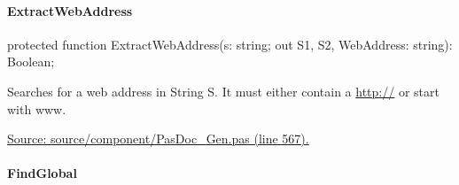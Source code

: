 \documentclass{report}
\newif\ifpdf
\begin{document}
\paragraph*{ExtractWebAddress}\hspace*{\fill}

\label{PasDoc_Gen.TDocGenerator-ExtractWebAddress}
\begin{list}{}{
\setlength{\itemindent}{0cm}
\setlength{\listparindent}{0cm}
\setlength{\leftmargin}{\evensidemargin}
\addtolength{\leftmargin}{\tmplength}
\settowidth{\labelsep}{X}
\addtolength{\leftmargin}{\labelsep}
\setlength{\labelwidth}{\tmplength}
}
\item[\textbf{Declaration}\hfill]
\ifpdf
\begin{flushleft}
\fi
\begin{ttfamily}
protected function ExtractWebAddress(s: string; out S1, S2, WebAddress: string): Boolean;\end{ttfamily}

\ifpdf
\end{flushleft}
\fi

\par
\item[\textbf{Description}]
Searches for a web address in String S. It must either contain a \href{http://}{http://} or start with www.\par
\href{https://github.com/pasdoc/pasdoc/blob/master/source/component/PasDoc_Gen.pas#L567}{Source: source/component/PasDoc{\_}Gen.pas (line 567).}

\end{list}
\paragraph*{FindGlobal}\hspace*{\fill}
\end{document}
